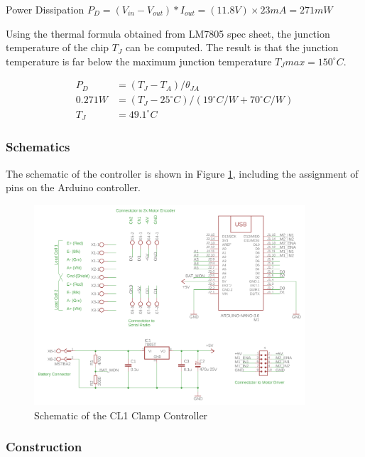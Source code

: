 Power Dissipation $P_D = (V_{in} - V_{out}) * I_{out} = (11.8V) \times 23mA = 271mW$

Using the thermal formula obtained from LM7805 spec sheet, the junction temperature of the chip $T_J$ can be computed. The result is that the junction temperature is far below the maximum junction temperature $T_J{max} = 150^{\circ}C$.

\begin{align}
    P_D &= (T_J - T_A) / \theta_{JA}\nonumber \\
    0.271W &= (T_J - 25^{\circ}C) / (19^{\circ}C/W + 70^{\circ}C/W)\nonumber \\
    T_J &= 49.1^{\circ}C\nonumber
\end{align}

\subsubsection{Schematics}
\label{subsubsection:exploration-1-schematics}

The schematic of the controller is shown in Figure \ref{fig:schematic-cl1-controller}, including the assignment of pins on the Arduino controller.

\begin{figure}
    \centering
    \includegraphics[width=0.90\textwidth]{images/04-3/SerialController_Schematic.png}
    \caption{Schematic of the CL1 Clamp Controller}
    \label{fig:schematic-cl1-controller}
\end{figure}


\subsubsection{Construction}
\label{subsubsection:exploration-1-construction}

